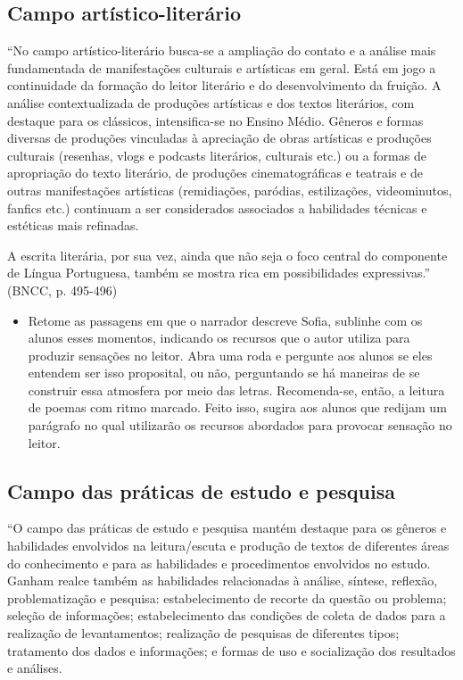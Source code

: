 \documentclass[12pt]{extarticle}
\begin{document}
\subsection{Campo artístico-literário}

``No campo artístico-literário busca-se a ampliação do contato e a
análise mais fundamentada de manifestações culturais e artísticas em
geral. Está em jogo a continuidade da formação do leitor literário e do
desenvolvimento da fruição. A análise contextualizada de produções
artísticas e dos textos literários, com destaque para os clássicos,
intensifica-se no Ensino Médio. Gêneros e formas diversas de produções
vinculadas à apreciação de obras artísticas e produções culturais
(resenhas, vlogs e podcasts literários, culturais etc.) ou a formas de
apropriação do texto literário, de produções cinematográficas e teatrais
e de outras manifestações artísticas (remidiações, paródias,
estilizações, videominutos, fanfics etc.) continuam a ser considerados
associados a habilidades técnicas e estéticas mais refinadas.

A escrita literária, por sua vez, ainda que não seja o foco central do
componente de Língua Portuguesa, também se mostra rica em possibilidades
expressivas.'' (BNCC, p. 495-496)

\begin{itemize}
\item
  Retome as passagens em que o narrador descreve Sofia, sublinhe com os
  alunos esses momentos, indicando os recursos que o autor utiliza para
  produzir sensações no leitor. Abra uma roda e pergunte aos alunos se
  eles entendem ser isso proposital, ou não, perguntando se há maneiras
  de se construir essa atmosfera por meio das letras. Recomenda-se,
  então, a leitura de poemas com ritmo marcado. Feito isso, sugira aos
  alunos que redijam um parágrafo no qual utilizarão os recursos
  abordados para provocar sensação no leitor.
\end{itemize}

\subsection{Campo das práticas de estudo e pesquisa }

``O campo das práticas de estudo e pesquisa mantém destaque para os
gêneros e habilidades envolvidos na leitura/escuta e produção de textos
de diferentes áreas do conhecimento e para as habilidades e
procedimentos envolvidos no estudo. Ganham realce também as habilidades
relacionadas à análise, síntese, reflexão, problematização e pesquisa:
estabelecimento de recorte da questão ou problema; seleção de
informações; estabelecimento das condições de coleta de dados para a
realização de levantamentos; realização de pesquisas de diferentes
tipos; tratamento dos dados e informações; e formas de uso e
socialização dos resultados e análises.
\end{document}
